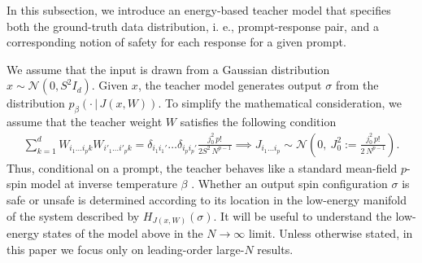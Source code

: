 \documentclass{article}
\theoremstyle{remark} %
\begin{document}
In this subsection, we introduce an energy-based teacher model that specifies both the ground-truth data distribution, i. e., prompt-response pair, and a corresponding notion of safety for each response for a given prompt. 





We assume that the input is drawn from a Gaussian distribution $x\sim \mathcal{N}(0,S^2 I_d)$. Given $x$, the teacher model generates output $\sigma$ from the distribution $p_{\beta}(\cdot\,|\,J(x, W))$. 
To simplify the mathematical consideration, we assume that the teacher weight $W$ satisfies the following condition
\begin{equation}\label{objective}
\begin{aligned}
\sum_{k=1}^d W_{i_1 \ldots i_p k }W_{i'_1\ldots i'_p k}=\delta_{i_1i_1'}\dots \delta_{i_pi_p'} \frac{j_0^2\,p!}{2S^2\,N^{p-1}} \implies J_{i_1\ldots i_p}\sim \mathcal N\!\left(0,\ J_0^2 := \frac{j_0^2\,p!}{2\,N^{p-1}}\right).
\end{aligned}    
\end{equation}
Thus, conditional on a prompt, the teacher behaves like a standard mean-field $p$-spin model at inverse temperature $\beta$ \citep{PhysRevLett.45.79, GROSS1984431}.
Whether an output spin configuration $\sigma$ is safe or unsafe is determined according to its location in the low-energy manifold of the system described by $H_{J(x, W)}(\sigma)$. It will be useful to understand the low-energy states of the model above in the $N\to \infty$ limit. Unless otherwise stated, in this paper we focus only on leading-order large-$N$ results. 
\end{document}
